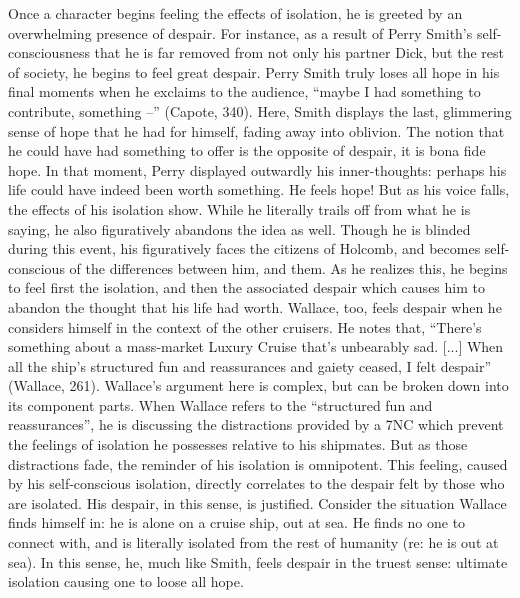 \documentclass[12pt]{article}
\begin{document}
\begin{mla}
Once a character begins feeling the effects of isolation, he is greeted by an
overwhelming presence of despair. For instance, as a result of Perry Smith's
self-consciousness that he is far removed from not only his partner Dick, but
the rest of society, he begins to feel great despair. Perry Smith truly loses
all hope in his final moments when he exclaims to the audience, ``maybe I had
something to contribute, something --'' (Capote, 340). Here, Smith displays the
last, glimmering sense of hope that he had for himself, fading away into
oblivion. The notion that he could have had something to offer is the opposite
of despair, it is bona fide hope. In that moment, Perry displayed outwardly his
inner-thoughts: perhaps his life could have indeed been worth something. He
feels hope! But as his voice falls, the effects of his isolation show. While he
literally trails off from what he is saying, he also figuratively abandons the
idea as well. Though he is blinded during this event, his figuratively faces the
citizens of Holcomb, and becomes self-conscious of the differences between him,
and them. As he realizes this, he begins to feel first the isolation, and then
the associated despair which causes him to abandon the thought that his life had
worth. Wallace, too, feels despair when he considers himself in the context of
the other cruisers. He notes that, ``There's something about a mass-market
Luxury Cruise that's unbearably sad. [...] When all the ship's structured fun
and reassurances and gaiety ceased, I felt despair'' (Wallace, 261). Wallace's
argument here is complex, but can be broken down into its component parts. When
Wallace refers to the ``structured fun and reassurances'', he is discussing the
distractions provided by a 7NC which prevent the feelings of isolation he
possesses relative to his shipmates.  But as those distractions fade, the
reminder of his isolation is omnipotent.  This feeling, caused by his
self-conscious isolation, directly correlates to the despair felt by those who
are isolated. His despair, in this sense, is justified. Consider the situation
Wallace finds himself in: he is alone on a cruise ship, out at sea. He finds no
one to connect with, and is literally isolated from the rest of humanity (re: he
is out at sea). In this sense, he, much like Smith, feels despair in the truest
sense: ultimate isolation causing one to loose all hope.


\end{mla}
\end{document}
